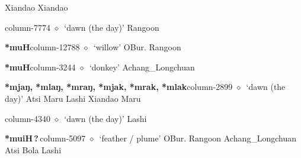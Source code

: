          Xiandao 
\hspace{1ex}
         Xiandao 
  \item {\footnotesize \textbf{}}{\tiny column-7774}
         $\diamond$~`dawn (the day)'
         Rangoon 
  \item {\footnotesize \textbf{*muH}}{\tiny column-12788}
         $\diamond$~`willow'
         OBur. 
\hspace{1ex}
         Rangoon 
  \item {\footnotesize \textbf{*muH}}{\tiny column-3244}
         $\diamond$~`donkey'
         Achang\_Longchuan 
  \item {\footnotesize \textbf{*mjaŋ, *mlaŋ, *mraŋ, *mjak, *mrak, *mlak}}{\tiny column-2899}
         $\diamond$~`dawn (the day)'
         Atsi 
\hspace{1ex}
         Maru 
\hspace{1ex}
         Lashi 
\hspace{1ex}
         Xiandao 
\hspace{1ex}
         Maru 
  \item {\footnotesize \textbf{}}{\tiny column-4340}
         $\diamond$~`dawn (the day)'
         Lashi 
  \item {\footnotesize \textbf{*muiH\,?\,}}{\tiny column-5097}
         $\diamond$~`feather / plume'
         OBur. 
\hspace{1ex}
         Rangoon 
\hspace{1ex}
         Achang\_Longchuan 
\hspace{1ex}
         Atsi 
\hspace{1ex}
         Bola 
\hspace{1ex}
         Lashi 
